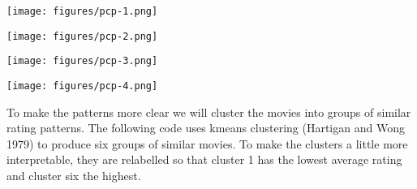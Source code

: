 \begin{Shaded}
\begin{Highlighting}[]
\StringTok{ } 
\StringTok{ }\NormalTok{()}
\end{Highlighting}
\end{Shaded}

\texttt{[image: figures/pcp-1.png]}

\begin{Shaded}
\begin{Highlighting}[]
\StringTok{ }\NormalTok{(}  \NormalTok{/}\StringTok{ }\NormalTok{)}
\end{Highlighting}
\end{Shaded}

\texttt{[image: figures/pcp-2.png]}

\begin{Shaded}
\begin{Highlighting}[]
\StringTok{ }\NormalTok{(} \NormalTok{, } \NormalTok{)}
\StringTok{ }\NormalTok{(} 
\end{Highlighting}
\end{Shaded}

\texttt{[image: figures/pcp-3.png]}

\begin{Shaded}
\begin{Highlighting}[]
\StringTok{ }\NormalTok{(}  \NormalTok{/}\StringTok{ }\NormalTok{, } 
\end{Highlighting}
\end{Shaded}

\texttt{[image: figures/pcp-4.png]}

To make the patterns more clear we will cluster the movies into groups
of similar rating patterns. The following code uses kmeans clustering
(Hartigan and Wong 1979) to produce six groups of similar movies. To
make the clusters a little more interpretable, they are relabelled so
that cluster 1 has the lowest average rating and cluster six the
highest. 

